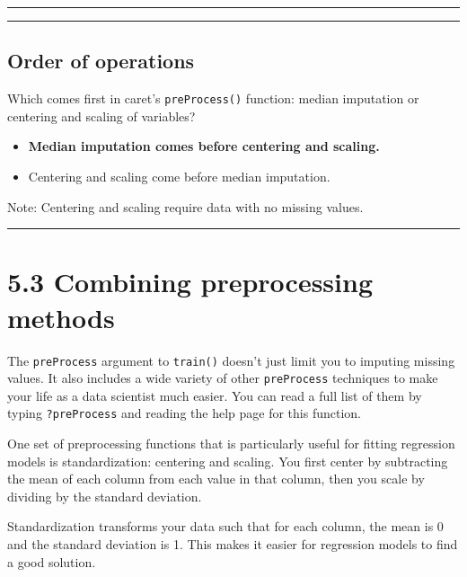 \documentclass[
]{book}
\begin{document}
\begin{center}\rule{0.5\linewidth}{0.5pt}\end{center}

\begin{center}\rule{0.5\linewidth}{0.5pt}\end{center}

\hypertarget{order-of-operations}{%
\subsection*{Order of operations}\label{order-of-operations}}

Which comes first in caret's \texttt{preProcess()} function: median imputation or centering and scaling of variables?

\begin{itemize}
\item
  \textbf{Median imputation comes before centering and scaling.}
\item
  Centering and scaling come before median imputation.
\end{itemize}

Note: Centering and scaling require data with no missing values.

\begin{center}\rule{0.5\linewidth}{0.5pt}\end{center}

\hypertarget{combining-preprocessing-methods}{%
\section{5.3 Combining preprocessing methods}\label{combining-preprocessing-methods}}

The \texttt{preProcess} argument to \texttt{train()} doesn't just limit you to imputing missing values. It also includes a wide variety of other \texttt{preProcess} techniques to make your life as a data scientist much easier. You can read a full list of them by typing \texttt{?preProcess} and reading the help page for this function.

One set of preprocessing functions that is particularly useful for fitting regression models is standardization: centering and scaling. You first center by subtracting the mean of each column from each value in that column, then you scale by dividing by the standard deviation.

Standardization transforms your data such that for each column, the mean is 0 and the standard deviation is 1. This makes it easier for regression models to find a good solution.
\end{document}

